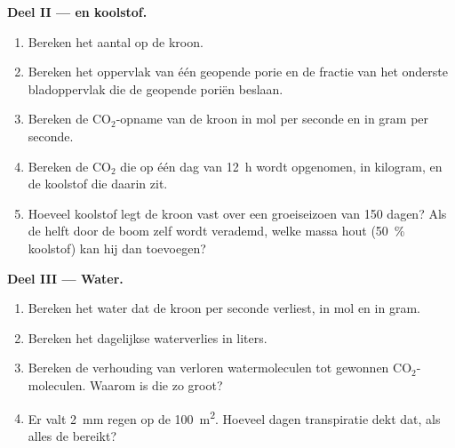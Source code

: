 \begin{problem}
\medskip
\noindent\textbf{Deel II ---  en koolstof.}
\begin{enumerate}[resume]
  \item Bereken het aantal  op de kroon.
  \item Bereken het oppervlak van één geopende porie en de fractie van het
        onderste bladoppervlak die de geopende poriën beslaan.
  \item Bereken de $\mathrm{CO_2}$-opname van de kroon in mol per seconde
        en in gram per seconde.
  \item Bereken de $\mathrm{CO_2}$ die op één dag van \qty{12}{h} wordt
        opgenomen, in kilogram, en de koolstof die daarin zit.
  \item Hoeveel koolstof legt de kroon vast over een groeiseizoen van
        \qty{150}{} dagen? Als de helft door de boom zelf wordt
        verademd, welke massa hout (\qty{50}{\%} koolstof) kan hij dan
        toevoegen?
\end{enumerate}

\medskip
\noindent\textbf{Deel III --- Water.}
\begin{enumerate}[resume]
  \item Bereken het water dat de kroon per seconde verliest, in mol en in
        gram.
  \item Bereken het dagelijkse waterverlies in liters.
  \item Bereken de verhouding van verloren watermoleculen tot gewonnen
        $\mathrm{CO_2}$-moleculen. Waarom is die zo groot?
  \item Er valt \qty{2}{mm} regen op de \qty{100}{m^2}. Hoeveel dagen
        transpiratie dekt dat, als alles de  bereikt?
\end{enumerate}


\end{problem}
